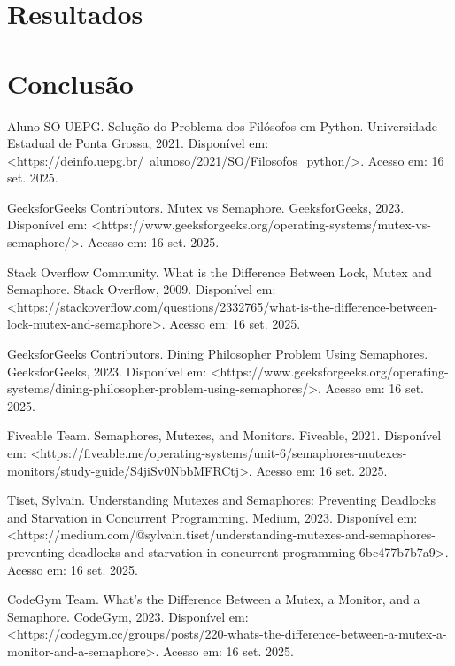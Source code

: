 \documentclass[12pt,a4paper,twoside]{article}
\begin{document}
\section{Resultados}
    

\section{Conclusão}
    


\begin{thebibliography}{12}
    Aluno SO UEPG. Solução do Problema dos Filósofos em Python. Universidade Estadual de Ponta Grossa, 2021. Disponível em: <https://deinfo.uepg.br/~alunoso/2021/SO/Filosofos_python/>. Acesso em: 16 set. 2025.
    
    GeeksforGeeks Contributors. Mutex vs Semaphore. GeeksforGeeks, 2023. Disponível em: <https://www.geeksforgeeks.org/operating-systems/mutex-vs-semaphore/>. Acesso em: 16 set. 2025.
    
    Stack Overflow Community. What is the Difference Between Lock, Mutex and Semaphore. Stack Overflow, 2009. Disponível em: <https://stackoverflow.com/questions/2332765/what-is-the-difference-between-lock-mutex-and-semaphore>. Acesso em: 16 set. 2025.
    
    GeeksforGeeks Contributors. Dining Philosopher Problem Using Semaphores. GeeksforGeeks, 2023. Disponível em: <https://www.geeksforgeeks.org/operating-systems/dining-philosopher-problem-using-semaphores/>. Acesso em: 16 set. 2025.
    
    Fiveable Team. Semaphores, Mutexes, and Monitors. Fiveable, 2021. Disponível em: <https://fiveable.me/operating-systems/unit-6/semaphores-mutexes-monitors/study-guide/S4jiSv0NbbMFRCtj>. Acesso em: 16 set. 2025.
    
    Tiset, Sylvain. Understanding Mutexes and Semaphores: Preventing Deadlocks and Starvation in Concurrent Programming. Medium, 2023. Disponível em: <https://medium.com/@sylvain.tiset/understanding-mutexes-and-semaphores-preventing-deadlocks-and-starvation-in-concurrent-programming-6bc477b7b7a9>. Acesso em: 16 set. 2025.
    
    CodeGym Team. What's the Difference Between a Mutex, a Monitor, and a Semaphore. CodeGym, 2023. Disponível em: <https://codegym.cc/groups/posts/220-whats-the-difference-between-a-mutex-a-monitor-and-a-semaphore>. Acesso em: 16 set. 2025.
\end{thebibliography}
\end{document}
